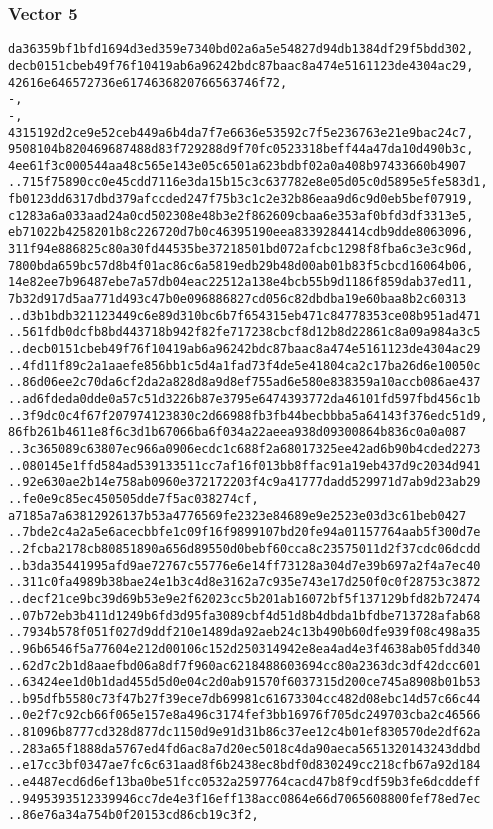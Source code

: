 \documentclass[
]{article}
\begin{document}
\hypertarget{vector-5-2}{%
\subsubsection{Vector 5}\label{vector-5-2}}

\begin{verbatim}
da36359bf1bfd1694d3ed359e7340bd02a6a5e54827d94db1384df29f5bdd302,
decb0151cbeb49f76f10419ab6a96242bdc87baac8a474e5161123de4304ac29,
42616e646572736e6174636820766563746f72,
-,
-,
4315192d2ce9e52ceb449a6b4da7f7e6636e53592c7f5e236763e21e9bac24c7,
9508104b820469687488d83f729288d9f70fc0523318beff44a47da10d490b3c,
4ee61f3c000544aa48c565e143e05c6501a623bdbf02a0a408b97433660b4907
..715f75890cc0e45cdd7116e3da15b15c3c637782e8e05d05c0d5895e5fe583d1,
fb0123dd6317dbd379afccded247f75b3c1c2e32b86eaa9d6c9d0eb5bef07919,
c1283a6a033aad24a0cd502308e48b3e2f862609cbaa6e353af0bfd3df3313e5,
eb71022b4258201b8c226720d7b0c46395190eea8339284414cdb9dde8063096,
311f94e886825c80a30fd44535be37218501bd072afcbc1298f8fba6c3e3c96d,
7800bda659bc57d8b4f01ac86c6a5819edb29b48d00ab01b83f5cbcd16064b06,
14e82ee7b96487ebe7a57db04eac22512a138e4bcb55b9d1186f859dab37ed11,
7b32d917d5aa771d493c47b0e096886827cd056c82dbdba19e60baa8b2c60313
..d3b1bdb321123449c6e89d310bc6b7f654315eb471c84778353ce08b951ad471
..561fdb0dcfb8bd443718b942f82fe717238cbcf8d12b8d22861c8a09a984a3c5
..decb0151cbeb49f76f10419ab6a96242bdc87baac8a474e5161123de4304ac29
..4fd11f89c2a1aaefe856bb1c5d4a1fad73f4de5e41804ca2c17ba26d6e10050c
..86d06ee2c70da6cf2da2a828d8a9d8ef755ad6e580e838359a10accb086ae437
..ad6fdeda0dde0a57c51d3226b87e3795e6474393772da46101fd597fbd456c1b
..3f9dc0c4f67f207974123830c2d66988fb3fb44becbbba5a64143f376edc51d9,
86fb261b4611e8f6c3d1b67066ba6f034a22aeea938d09300864b836c0a0a087
..3c365089c63807ec966a0906ecdc1c688f2a68017325ee42ad6b90b4cded2273
..080145e1ffd584ad539133511cc7af16f013bb8ffac91a19eb437d9c2034d941
..92e630ae2b14e758ab0960e372172203f4c9a41777dadd529971d7ab9d23ab29
..fe0e9c85ec450505dde7f5ac038274cf,
a7185a7a63812926137b53a4776569fe2323e84689e9e2523e03d3c61beb0427
..7bde2c4a2a5e6acecbbfe1c09f16f9899107bd20fe94a01157764aab5f300d7e
..2fcba2178cb80851890a656d89550d0bebf60cca8c23575011d2f37cdc06dcdd
..b3da35441995afd9ae72767c55776e6e14ff73128a304d7e39b697a2f4a7ec40
..311c0fa4989b38bae24e1b3c4d8e3162a7c935e743e17d250f0c0f28753c3872
..decf21ce9bc39d69b53e9e2f62023cc5b201ab16072bf5f137129bfd82b72474
..07b72eb3b411d1249b6fd3d95fa3089cbf4d51d8b4dbda1bfdbe713728afab68
..7934b578f051f027d9ddf210e1489da92aeb24c13b490b60dfe939f08c498a35
..96b6546f5a77604e212d00106c152d250314942e8ea4ad4e3f4638ab05fdd340
..62d7c2b1d8aaefbd06a8df7f960ac6218488603694cc80a2363dc3df42dcc601
..63424ee1d0b1dad455d5d0e04c2d0ab91570f6037315d200ce745a8908b01b53
..b95dfb5580c73f47b27f39ece7db69981c61673304cc482d08ebc14d57c66c44
..0e2f7c92cb66f065e157e8a496c3174fef3bb16976f705dc249703cba2c46566
..81096b8777cd328d877dc1150d9e91d31b86c37ee12c4b01ef830570de2df62a
..283a65f1888da5767ed4fd6ac8a7d20ec5018c4da90aeca5651320143243ddbd
..e17cc3bf0347ae7fc6c631aad8f6b2438ec8bdf0d830249cc218cfb67a92d184
..e4487ecd6d6ef13ba0be51fcc0532a2597764cacd47b8f9cdf59b3fe6dcddeff
..9495393512339946cc7de4e3f16eff138acc0864e66d7065608800fef78ed7ec
..86e76a34a754b0f20153cd86cb19c3f2,
\end{verbatim}
\end{document}
